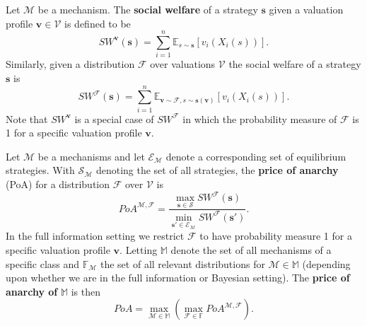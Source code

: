 \begin{definition}
  Let $ \mathcal{M} $ be a mechanism. The \textbf{social welfare} of a strategy $ \mathbf{s} $ given a valuation profile $ \mathbf{v} \in \mathcal{V} $ is defined to be
  \begin{equation}
    SW^\mathbf{v}(\mathbf{s}) = \sum_{i = 1}^{n} \mathbb{E}_{s \sim \mathbf{s}}[v_i(X_i(s))].
    \label{eq:socialwelfare}
  \end{equation}
  Similarly, given a distribution $ \mathcal{F} $ over valuations $ \mathcal{V} $ the social welfare of a strategy $ \mathbf{s} $ is
  \begin{equation}
    SW^{\mathcal{F}}(\mathbf{s}) = \sum_{i =1}^{n} \mathbb{E}_{\mathbf{v} \sim \mathcal{F}, s \sim \mathbf{s}(\mathbf{v})}[v_i(X_i(s))].
  \end{equation}
  Note that $ SW^{\mathbf{v}} $ is a special case of $ SW^{\mathcal{F}} $ in which the probability measure of $ \mathcal{F} $ is 1 for a specific valuation profile $ \mathbf{v} $.
\end{definition}
\begin{definition}
  Let $ \mathcal{M} $ be a mechanisms and let $ \mathcal{E}_\mathcal{M} $ denote a corresponding set of equilibrium strategies. With $ \mathcal{S}_\mathcal{M} $ denoting the set of all strategies, the \textbf{price of anarchy} (PoA) for a distribution $ \mathcal{F} $ over $ \mathcal{V} $ is
  \begin{equation}
    PoA^{\mathcal{M}, \mathcal{F}} = \frac{\max_{\mathbf{s} \in \mathcal{S}}SW^{\mathcal{F}}(\mathbf{s})}{\min_{\mathbf{s}' \in \mathcal{E}_{\mathcal{M}}}SW^{\mathcal{F}}(\mathbf{s'})}.
  \end{equation}
  In the full information setting we restrict $ \mathcal{F} $ to have probability measure 1 for a specific valuation profile $ \mathbf{v} $. Letting $ \mathbb{M} $ denote the set of all mechanisms of a specific class and $ \mathbb{F}_{\mathcal{M}} $ the set of all relevant distributions for $ \mathcal{M} \in \mathbb{M} $ (depending upon whether we are in the full information or Bayesian setting). The \textbf{price of anarchy of} $ \mathbb{M} $ is then
  \begin{equation}
    PoA = \max_{\mathcal{M} \in \mathbb{M}}\left( \max_{\mathcal{F} \in \mathbb{F}} PoA^{\mathcal{M}, \mathcal{F}} \right).
    \label{eq:priceofanarchy}
  \end{equation}
\end{definition}

